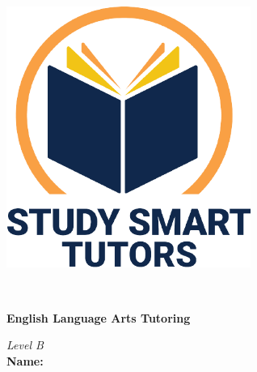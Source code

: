 \documentclass[12pt]{article}
\title{}
\date{}
\begin{document}
\thispagestyle{empty}

\vspace*{\fill}

\vspace*{3cm}

\begin{center}

    \includegraphics[width=0.6\textwidth]{SST_Color_Logo.png} %
    
    \vspace{1cm} %
    
    \Huge \textbf{} \\
    \vspace{0.3cm}
    
    \Huge \textbf{English Language Arts  Tutoring}\\ [0.3cm]
 \vspace{1.5cm}
    
    \LARGE \textit{Level B }\\[1cm] 


    \LARGE \textbf{Name:} \underline{\hspace{8cm}}
    
    
    \vspace{0.5cm}
    
    \vspace{1cm}
   
    
    \vfill %
    
\end{center}
\end{document}
